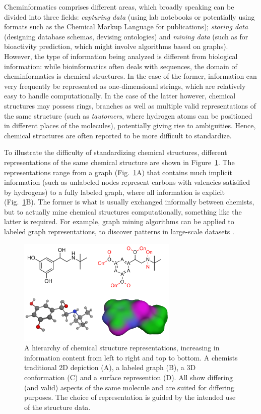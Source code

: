 \documentclass{sig-alternate}
\begin{document}
Cheminformatics comprises different areas, which broadly speaking can
be divided into three fields: \emph{capturing data} (using lab
notebooks or potentially using formats such as the Chemical Markup
Language for publications); \emph{storing data} (designing database
schemas, devising ontologies) and \emph{mining data} (such as for
bioactivity prediction, which might involve algorithms based on
graphs).  However, the type of information being analyzed is different
from biological information: while bioinformatics often deals with
sequences, the domain of cheminformatics is chemical structures. In
the case of the former, information can very frequently be represented
as one-dimensional strings, which are relatively easy to handle
computationally. In the case of the latter however, chemical
structures may possess rings, branches as well as multiple valid
representations of the same structure (such as \emph{tautomers}, where hydrogen atoms can be positioned in different
places of the molecules), potentially giving rise to
ambiguities. Hence, chemical structures are often reported to be more
difficult to standardize.

To illustrate the difficulty of standardizing chemical structures,
different representations of the same chemical structure are shown in
Figure~\ref{figure:chemical-structures}. The representations range
from a graph (Fig.~\ref{figure:chemical-structures}A) that contains
much implicit information (such as unlabeled nodes represent carbons
with valencies satisified by hydrogens) to a fully labeled graph,
where all information is explicit
(Fig.~\ref{figure:chemical-structures}B). The former is what is
usually exchanged informally between chemists, but to actually mine
chemical structures computationally, something like the latter is
required.  For example, graph mining algorithms can be applied to
labeled graph representations, to discover patterns in large-scale
datasets \cite{horst2009}.

\begin{figure}
\centering
\includegraphics[height=2in]{chemical-structures.png}
\caption{A hierarchy of chemical structure representations, increasing
  in information content from left to right and top to bottom. A
  chemists traditional 2D depiction (A), a labeled graph (B), a 3D
  conformation (C) and a surface represention (D). All show differing
  (and valid) aspects of the same molecule and are suited for
  differing purposes. The choice of representation is guided by the
  intended use of the structure data.}
\label{figure:chemical-structures}
\end{figure}
\end{document}
